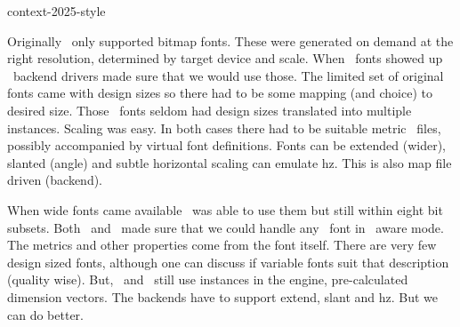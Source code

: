 
\environment context-2025-style



\setupbackgrounds
  [text]
  [background=extratext]


\setupalign[flushleft]

\setuptyping
  [align=hangright,
   keeptogether=paragraph,
   numbering=]

\startdocument
  [title={compact fonts},
   banner={a practical approach},
   location={context\enspace{\bf 2025}\enspace meeting}]

\starttitle[title=Eight bit(maps)]

\startitemize
\startitem
    Originally \TEX\ only supported bitmap fonts. These were generated
    on demand at the right resolution, determined by target device and
    scale.
\stopitem
\startitem
    When \TYPEONE\ fonts showed up \POSTSCRIPT\ backend drivers made
    sure that we would use those.
\stopitem
\startitem
    The limited set of original fonts came with design sizes so there had to be
    some mapping (and choice) to desired size.
\stopitem
\startitem
    Those \POSTSCRIPT\ fonts seldom had design sizes translated into multiple
    instances. Scaling was easy.
\stopitem
\startitem
    In both cases there had to be suitable metric \TFM\ files, possibly
    accompanied by virtual font definitions.
\stopitem
\startitem
    Fonts can be extended (wider), slanted (angle) and subtle horizontal
    scaling can emulate hz. This is also map file driven (backend).
\stopitem
\stopitemize

\stoptitle

\starttitle[title=Going wide]

\startitemize
\startitem
    When wide fonts came available \PDFTEX\ was able to use them but still within
    eight bit subsets.
\stopitem
\startitem
    Both \XETEX\ and \LUATEX\ made sure that we could handle any \OPENTYPE\ font
    in \UNICODE\ aware mode.
\stopitem
\startitem
    The metrics and other properties come from the font itself. There are very
    few design sized fonts, although one can discuss if variable fonts suit that
    description (quality wise).
\stopitem
\startitem
    But, \XETEX\ and \LUATEX\ still use instances in the engine, pre-calculated
    dimension vectors.
\stopitem
\startitem
    The backends have to support extend, slant and hz.
\stopitem
\startitem
    But we can do better.
\stopitem
\stopitemize

